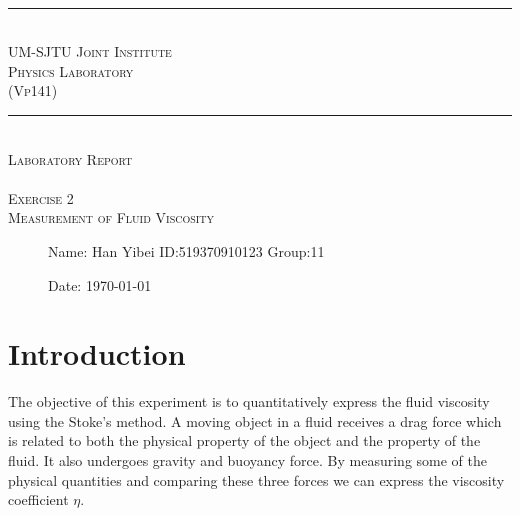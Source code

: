 \documentclass[12pt,a4paper]{article}
\begin{document}
\begin{center}
~\\
\rule[0mm]{400pt}{0.5pt}
\Large{ \textsc{\newline\\UM-SJTU Joint Institute\\Physics Laboratory\\(Vp141)\\}}
\rule[0mm]{400pt}{0.5pt}
\Large{ \textsc{\newline\newline\newline\newline\newline\newline\\
Laboratory Report\\}}
\Large{\textsc{ \\ Exercise 2  \\ Measurement of Fluid Viscosity} }

\end{center}

\begin{description}
    \item[] 
    \item[] 
    \item[] 
    \item[] 
    \item[] 
    \item[]
    \item[]\qquad \qquad Name: Han Yibei \qquad ID:519370910123   \qquad    Group:11\\
    \item[]\qquad \qquad Date: \today
\end{description}

\newpage


\section{Introduction}

The objective of this experiment is to quantitatively express the fluid viscosity using the Stoke’s method. A moving object in a fluid receives a drag force which is related to both the physical property of the object and the property of the fluid. It also undergoes gravity and buoyancy force. By measuring some of the physical quantities and comparing these three forces we can express the viscosity coefficient $\eta$.
\end{document}
